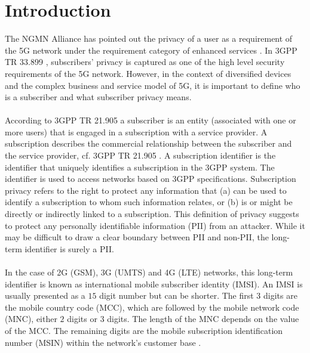 \documentclass[lnicst,sechang,a4paper]{svmultln}
\begin{document}
\section{Introduction}
\label{intro} The NGMN Alliance has pointed out the privacy of a user as a requirement of the 5G network under the requirement category of enhanced services \cite{NGMN_white_paper}. In 3GPP TR 33.899 \cite{TR33899}, subscribers' privacy is captured as one of the high level security requirements of the 5G network. However, in the context of diversified devices and the complex business and service model of 5G, it is important to define who is a subscriber and what subscriber privacy means. 
\paragraph{}
According to 3GPP TR 21.905 \cite{TR21905} a subscriber is an entity (associated with one or more users) that is engaged in a subscription with a service provider. A subscription describes the commercial relationship between the subscriber and the service provider, cf. 3GPP TR 21.905 \cite{TR21905}. A subscription identifier is the identifier that uniquely identifies a subscription in the 3GPP system. The identifier is used to access networks based on 3GPP specifications. Subscription privacy refers to the right to protect any information that (a) can be used to identify a subscription to whom such information relates, or (b) is or might be directly or indirectly linked to a subscription. This definition of privacy suggests to protect any personally identifiable information (PII) from an attacker. While it may be difficult to draw a clear boundary between PII and non-PII, the long-term identifier is surely a PII. 
\paragraph{}
In the case of 2G (GSM), 3G (UMTS) and 4G (LTE) networks, this long-term identifier is known as international mobile subscriber identity (IMSI). An IMSI is usually presented as a $15$ digit number but can be shorter. The first $3$ digits are the mobile country code (MCC), which are followed by the mobile network code (MNC), either $2$ digits or $3$ digits. The length of the MNC depends on the value of the MCC. The remaining digits are the mobile subscription identification number (MSIN) within the network's customer base \cite{TS23003}. 
\end{document}
